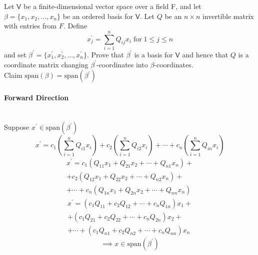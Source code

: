 Let $\mathsf{V}$ be a finite-dimensional vector space over a field F,
and let $\beta=\{x_1,x_2,\dots,x_n\}$ be an ordered basis for
$\mathsf{V}$. Let $Q$ be an $n\times n$ invertible matrix with
entries from $F$. Define
\[
x^\prime_j = \sum\limits^n_{i=1} Q_{ij}x_i \;\text{for}\; 1\leq j\leq n
\]
and set $\beta^\prime =
\{x_1^\prime,x_2^\prime,\dots,x_n^\prime\}$. Prove that $\beta^\prime$
is a basis for $\mathsf{V}$ and hence that $Q$ is a coordinate matrix
changing $\beta^\prime$-coordinates into $\beta$-coordinates.
\\Claim $\text{span}(\beta) =\text{span}(\beta^\prime)$
\paragraph{Forward Direction}\hfill\\
Suppose $x^\prime \in \text{span}(\beta^\prime)$ 
\begin{equation}
x^\prime = c_1\left(\sum\limits_{i=1}^nQ_{i1}x_i\right) +
c_2\left(\sum\limits_{i=1}^nQ_{i2}x_i\right) + \cdots +
c_n\left(\sum\limits_{i=1}^nQ_{in}x_i\right)
\end{equation}
\begin{multline}
x^\prime = c_1\left(Q_{11}x_1 + Q_{21}x_2+\cdots+Q_{n1}x_n\right) + \\
 +c_2\left(Q_{12}x_1 + Q_{22}x_2 + \cdots + Q_{n2}x_n\right)+ \\ 
+ \cdots + c_n\left(Q_{1n}x_1 + Q_{2n}x_2 + \cdots + Q_{nn}x_n\right)
\end{multline}
\begin{multline}
x^\prime = (c_1Q_{11} + c_2Q_{12} + \cdots + c_nQ_{1n})x_1 + \\
+ (c_1Q_{21} +c_2Q_{22} + \cdots + c_nQ_{2n})x_2 +\\
+\cdots + (c_1Q_{n1} + c_2Q_{n2} + \cdots + c_nQ_{nn})x_n
\end{multline}
\begin{equation}
\implies x \in \text{span}(\beta^\prime)
\end{equation}
